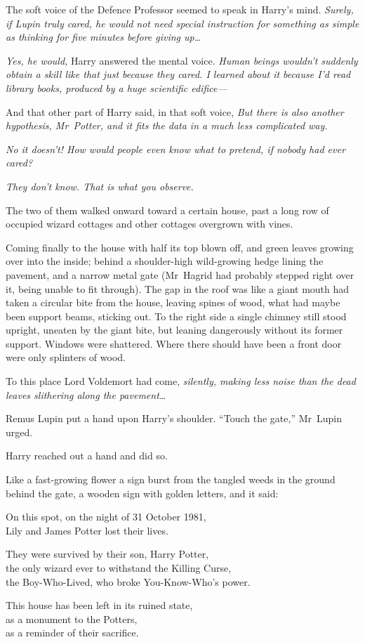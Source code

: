 The soft voice of the Defence Professor seemed to speak in Harry’s mind. \emph{Surely, if Lupin truly cared, he would not need special instruction for something as simple as thinking for five minutes before giving up…}

\emph{Yes, he would,} Harry answered the mental voice. \emph{Human beings wouldn’t suddenly obtain a skill like that just because they cared. I learned about it because I’d read library books, produced by a huge scientific edifice—}

And that other part of Harry said, in that soft voice, \emph{But there is also another hypothesis, Mr~Potter, and it fits the data in a much less complicated way.}

\emph{No it doesn’t! How would people even know what to pretend, if nobody had ever cared?}

\emph{They don’t know. That is what you observe.}

The two of them walked onward toward a certain house, past a long row of occupied wizard cottages and other cottages overgrown with vines.

Coming finally to the house with half its top blown off, and green leaves growing over into the inside; behind a shoulder-high wild-growing hedge lining the pavement, and a narrow metal gate (Mr~Hagrid had probably stepped right over it, being unable to fit through). The gap in the roof was like a giant mouth had taken a circular bite from the house, leaving spines of wood, what had maybe been support beams, sticking out. To the right side a single chimney still stood upright, uneaten by the giant bite, but leaning dangerously without its former support. Windows were shattered. Where there should have been a front door were only splinters of wood.

To this place Lord Voldemort had come, \emph{silently, making less noise than the dead leaves slithering along the pavement…}

Remus Lupin put a hand upon Harry’s shoulder.
“Touch the gate,” Mr~Lupin urged.

Harry reached out a hand and did so.

Like a fast-growing flower a sign burst from the tangled weeds in the ground behind the gate, a wooden sign with golden letters, and it said:

\begin{center}
On this spot, on the night of 31 October 1981,\\
Lily and James Potter lost their lives.

They were survived by their son, Harry Potter,\\
the only wizard ever to withstand the Killing Curse,\\
the Boy-Who-Lived, who broke You-Know-Who’s power.

This house has been left in its ruined state,\\
as a monument to the Potters,\\
as a reminder of their sacrifice.
\end{center}


